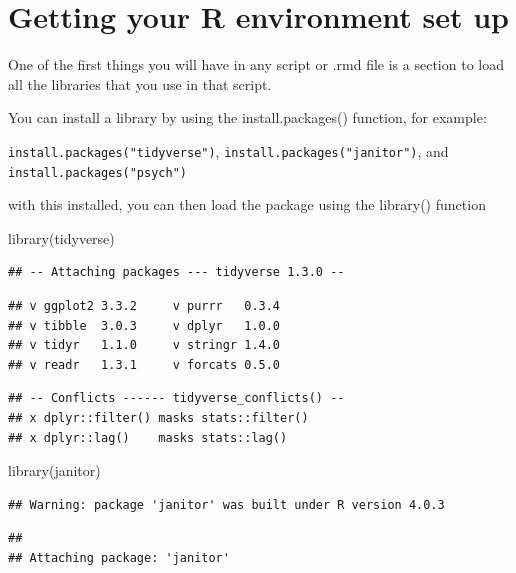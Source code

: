 \documentclass[
]{book}
\newenvironment{Shaded}{\begin{snugshade}}{\end{snugshade}}
\newcommand{\FunctionTok}[1]{\textcolor[rgb]{0.00,0.00,0.00}{#1}}
\newcommand{\NormalTok}[1]{#1}
\begin{document}
\hypertarget{getting-your-r-environment-set-up}{%
\section{Getting your R environment set up}\label{getting-your-r-environment-set-up}}

One of the first things you will have in any script or .rmd file is a section to load all the libraries that you use in that script.

You can install a library by using the install.packages() function, for example:

\texttt{install.packages("tidyverse")}, \texttt{install.packages("janitor")}, and \texttt{install.packages("psych")}

with this installed, you can then load the package using the library() function

\begin{Shaded}
\begin{Highlighting}[]
\FunctionTok{library}\NormalTok{(tidyverse)}
\end{Highlighting}
\end{Shaded}

\begin{verbatim}
## -- Attaching packages --- tidyverse 1.3.0 --
\end{verbatim}

\begin{verbatim}
## v ggplot2 3.3.2     v purrr   0.3.4
## v tibble  3.0.3     v dplyr   1.0.0
## v tidyr   1.1.0     v stringr 1.4.0
## v readr   1.3.1     v forcats 0.5.0
\end{verbatim}

\begin{verbatim}
## -- Conflicts ------ tidyverse_conflicts() --
## x dplyr::filter() masks stats::filter()
## x dplyr::lag()    masks stats::lag()
\end{verbatim}

\begin{Shaded}
\begin{Highlighting}[]
\FunctionTok{library}\NormalTok{(janitor)}
\end{Highlighting}
\end{Shaded}

\begin{verbatim}
## Warning: package 'janitor' was built under R version 4.0.3
\end{verbatim}

\begin{verbatim}
## 
## Attaching package: 'janitor'
\end{verbatim}
\end{document}
